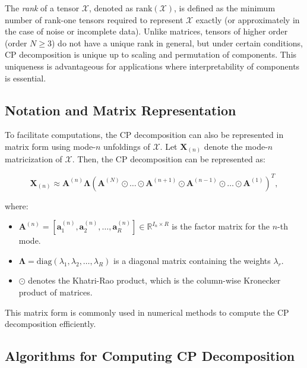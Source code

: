 \documentclass[a4paper,14pt]{article}
\renewcommand{\geq}{\ensuremath{\geqslant}}
\theoremstyle{plain} %
\theoremstyle{definition} %
\theoremstyle{remark} %
\theoremstyle{definition}
\theoremstyle{remark}
\theoremstyle{remark}
\begin{document}
	The \textit{rank} of a tensor \(\mathcal{X}\), denoted as \(\text{rank}(\mathcal{X})\), is defined as the minimum number of rank-one tensors required to represent \(\mathcal{X}\) exactly (or approximately in the case of noise or incomplete data). Unlike matrices, tensors of higher order (order \( N \geq 3 \)) do not have a unique rank in general, but under certain conditions, CP decomposition is unique up to scaling and permutation of components. This uniqueness is advantageous for applications where interpretability of components is essential.
	
	\subsection{Notation and Matrix Representation}
	
	To facilitate computations, the CP decomposition can also be represented in matrix form using mode-\( n \) unfoldings of \(\mathcal{X}\). Let \(\mathbf{X}_{(n)}\) denote the mode-\( n \) matricization of \(\mathcal{X}\). Then, the CP decomposition can be represented as:
	
	\begin{equation}
		\mathbf{X}_{(n)} \approx \mathbf{A}^{(n)} \mathbf{\Lambda} \left( \mathbf{A}^{(N)} \odot \dots \odot \mathbf{A}^{(n+1)} \odot \mathbf{A}^{(n-1)} \odot \dots \odot \mathbf{A}^{(1)} \right)^T,
	\end{equation}
	
	where:
	\begin{itemize}
		\item \(\mathbf{A}^{(n)} = [\mathbf{a}^{(n)}_1, \mathbf{a}^{(n)}_2, \dots, \mathbf{a}^{(n)}_R] \in \mathbb{R}^{I_n \times R}\) is the factor matrix for the \(n\)-th mode.
		\item \(\mathbf{\Lambda} = \text{diag}(\lambda_1, \lambda_2, \dots, \lambda_R)\) is a diagonal matrix containing the weights \(\lambda_r\).
		\item \(\odot\) denotes the Khatri-Rao product, which is the column-wise Kronecker product of matrices.
	\end{itemize}
	
	This matrix form is commonly used in numerical methods to compute the CP decomposition efficiently.
	
	\subsection{Algorithms for Computing CP Decomposition}
	
\end{document}
